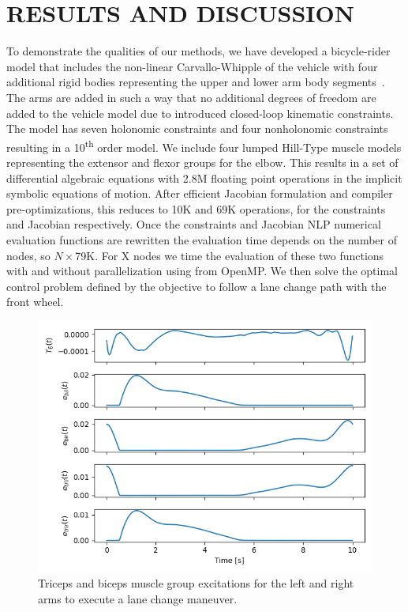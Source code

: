 \documentclass[11pt,twocolumn]{article}
\begin{document}
\section*{RESULTS AND DISCUSSION}
%
To demonstrate the qualities of our methods, we have developed a bicycle-rider
model that includes the non-linear Carvallo-Whipple of the vehicle with four
additional rigid bodies representing the upper and lower arm body
segments~\cite{Stienstra2023a}. The arms are added in such a way that no
additional degrees of freedom are added to the vehicle model due to introduced
closed-loop kinematic constraints. The model has seven holonomic constraints and
four nonholonomic constraints resulting in a 10\textsuperscript{th} order model.
We include four lumped Hill-Type muscle models representing the extensor and
flexor groups for the elbow. This results in a set of differential algebraic
equations with 2.8M floating point operations in the implicit symbolic equations
of motion. After efficient Jacobian formulation and compiler pre-optimizations,
this reduces to 10K and 69K operations, for the constraints and Jacobian
respectively. Once the constraints and Jacobian NLP numerical evaluation
functions are rewritten the evaluation time depends on the number of nodes, so
\(N\times\)79K. For X nodes we time the evaluation of these two functions with
and without parallelization using from OpenMP. We then solve the optimal control
problem defined by the objective to follow a lane change path with the front
wheel.

\begin{figure}
    \centering
    \includegraphics[width=\linewidth]{figures/arm-muscle-bicycle-excitation.png}
    \caption{Triceps and biceps muscle group excitations for the left and right arms to execute a lane change maneuver.}
    \label{fig:enter-label}
\end{figure}
\end{document}

